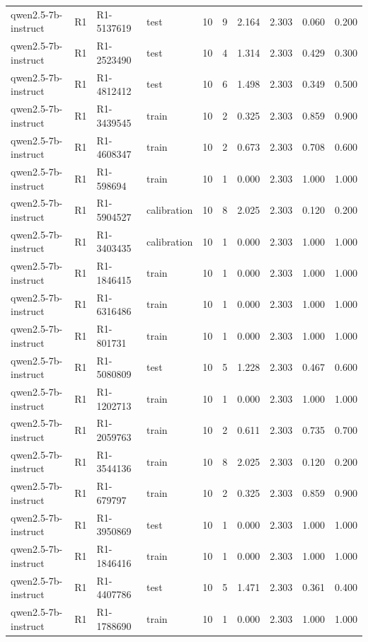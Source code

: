 \begin{table}
\begin{tabular}{llllrrrrrr}
qwen2.5-7b-instruct & R1 & R1-5137619 & test & 10 & 9 & 2.164 & 2.303 & 0.060 & 0.200 \\
qwen2.5-7b-instruct & R1 & R1-2523490 & test & 10 & 4 & 1.314 & 2.303 & 0.429 & 0.300 \\
qwen2.5-7b-instruct & R1 & R1-4812412 & test & 10 & 6 & 1.498 & 2.303 & 0.349 & 0.500 \\
qwen2.5-7b-instruct & R1 & R1-3439545 & train & 10 & 2 & 0.325 & 2.303 & 0.859 & 0.900 \\
qwen2.5-7b-instruct & R1 & R1-4608347 & train & 10 & 2 & 0.673 & 2.303 & 0.708 & 0.600 \\
qwen2.5-7b-instruct & R1 & R1-598694 & train & 10 & 1 & 0.000 & 2.303 & 1.000 & 1.000 \\
qwen2.5-7b-instruct & R1 & R1-5904527 & calibration & 10 & 8 & 2.025 & 2.303 & 0.120 & 0.200 \\
qwen2.5-7b-instruct & R1 & R1-3403435 & calibration & 10 & 1 & 0.000 & 2.303 & 1.000 & 1.000 \\
qwen2.5-7b-instruct & R1 & R1-1846415 & train & 10 & 1 & 0.000 & 2.303 & 1.000 & 1.000 \\
qwen2.5-7b-instruct & R1 & R1-6316486 & train & 10 & 1 & 0.000 & 2.303 & 1.000 & 1.000 \\
qwen2.5-7b-instruct & R1 & R1-801731 & train & 10 & 1 & 0.000 & 2.303 & 1.000 & 1.000 \\
qwen2.5-7b-instruct & R1 & R1-5080809 & test & 10 & 5 & 1.228 & 2.303 & 0.467 & 0.600 \\
qwen2.5-7b-instruct & R1 & R1-1202713 & train & 10 & 1 & 0.000 & 2.303 & 1.000 & 1.000 \\
qwen2.5-7b-instruct & R1 & R1-2059763 & train & 10 & 2 & 0.611 & 2.303 & 0.735 & 0.700 \\
qwen2.5-7b-instruct & R1 & R1-3544136 & train & 10 & 8 & 2.025 & 2.303 & 0.120 & 0.200 \\
qwen2.5-7b-instruct & R1 & R1-679797 & train & 10 & 2 & 0.325 & 2.303 & 0.859 & 0.900 \\
qwen2.5-7b-instruct & R1 & R1-3950869 & test & 10 & 1 & 0.000 & 2.303 & 1.000 & 1.000 \\
qwen2.5-7b-instruct & R1 & R1-1846416 & train & 10 & 1 & 0.000 & 2.303 & 1.000 & 1.000 \\
qwen2.5-7b-instruct & R1 & R1-4407786 & test & 10 & 5 & 1.471 & 2.303 & 0.361 & 0.400 \\
qwen2.5-7b-instruct & R1 & R1-1788690 & train & 10 & 1 & 0.000 & 2.303 & 1.000 & 1.000 \\

\end{tabular}
\end{table}
